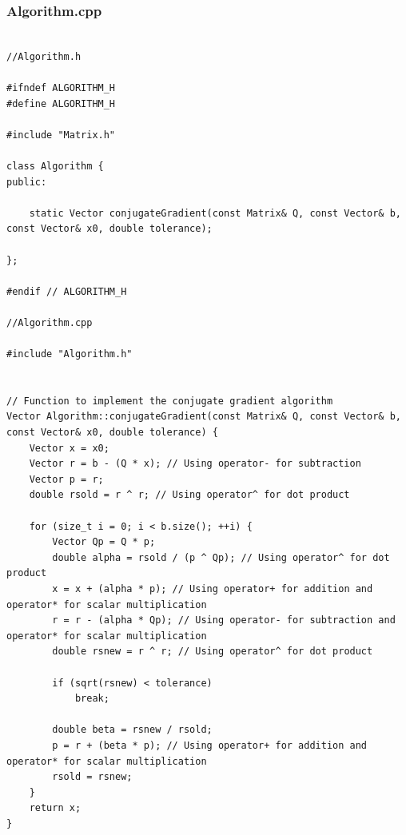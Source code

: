 \documentclass[12pt,twoside]{article}
\begin{document}
\subsubsection{Algorithm.cpp}
\scriptsize
\begin{verbatim}

//Algorithm.h

#ifndef ALGORITHM_H
#define ALGORITHM_H

#include "Matrix.h"

class Algorithm {
public:

    static Vector conjugateGradient(const Matrix& Q, const Vector& b, const Vector& x0, double tolerance);

};

#endif // ALGORITHM_H

//Algorithm.cpp

#include "Algorithm.h"


// Function to implement the conjugate gradient algorithm
Vector Algorithm::conjugateGradient(const Matrix& Q, const Vector& b, const Vector& x0, double tolerance) {
    Vector x = x0;
    Vector r = b - (Q * x); // Using operator- for subtraction
    Vector p = r;
    double rsold = r ^ r; // Using operator^ for dot product

    for (size_t i = 0; i < b.size(); ++i) {
        Vector Qp = Q * p;
        double alpha = rsold / (p ^ Qp); // Using operator^ for dot product
        x = x + (alpha * p); // Using operator+ for addition and operator* for scalar multiplication
        r = r - (alpha * Qp); // Using operator- for subtraction and operator* for scalar multiplication
        double rsnew = r ^ r; // Using operator^ for dot product

        if (sqrt(rsnew) < tolerance)
            break;

        double beta = rsnew / rsold;
        p = r + (beta * p); // Using operator+ for addition and operator* for scalar multiplication
        rsold = rsnew;
    }
    return x;
}

\end{verbatim}
\end{document}
